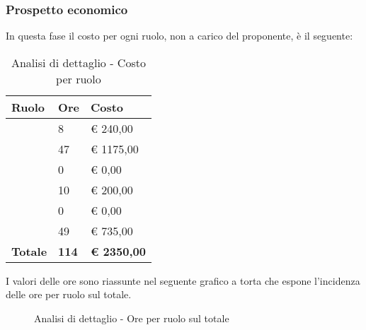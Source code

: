 		\subsubsection{Prospetto economico} %
		\label{ssub:prospetto_economico}
		In questa fase il costo per ogni ruolo, non a carico del proponente, è il seguente: \\
			\begin{table}[!ht]
				\begin{center}
					\begin{tabularx}{0.65\textwidth}{|l|l|X|}
						\hline
						\textbf{Ruolo} & \textbf{Ore} & \textbf{Costo} \\
						\hline
						\roleProjectManager & 8 & \euro{} 240,00 \\
						\hline
						\roleAnalyst & 47 & \euro{} 1175,00 \\
						\hline
						\roleDesigner & 0 & \euro{} 0,00 \\
						\hline
						\roleAdministrator & 10 & \euro{} 200,00 \\
						\hline
						\roleProgrammer & 0 & \euro{} 0,00 \\
						\hline
						\roleVerifier & 49 & \euro{} 735,00 \\
						\hline
						\textbf{Totale} & \textbf{114} & \textbf{\euro{} 2350,00} \\
						\hline
					\end{tabularx}
				\end{center}
			\caption{Analisi di dettaglio - Costo per ruolo}
			\end{table}

			\noindent
			I valori delle ore sono riassunte nel seguente grafico a torta che espone l’incidenza delle ore per ruolo sul totale.
			\begin{center}
				\begin{figure}[htbp]
				\vspace{0.8cm}
				\caption{Analisi di dettaglio - Ore per ruolo sul totale}
				\end{figure}
			\end{center}

